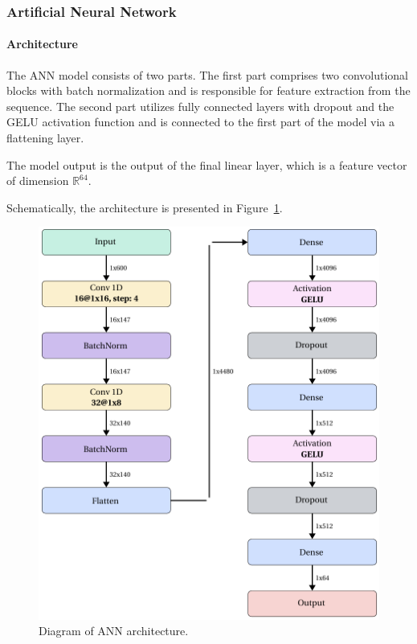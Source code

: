 \documentclass[pdflatex,sn-vancouver-num]{sn-jnl}%
\begin{document}
            \subsubsection{Artificial Neural Network}
                \paragraph{Architecture}
                The ANN model consists of two parts. The first part comprises two convolutional blocks with batch normalization and is responsible for feature extraction from the sequence. The second part utilizes fully connected layers with dropout and the GELU activation function \cite{Hendrycks:2016} and is connected to the first part of the model via a flattening layer.

                The model output is the output of the final linear layer, which is a feature vector of dimension \( \mathbb{R}^{64} \).

                Schematically, the architecture is presented in Figure~\ref{Picture:NeuralModel}.

                \begin{figure}[!htb]
                    \begin{center}
                        \includegraphics[width=\textwidth]{picture_ann_network.png}
                    \end{center}
                    \caption{
                        Diagram of ANN architecture.
                    }\label{Picture:NeuralModel}
                \end{figure}
\end{document}
